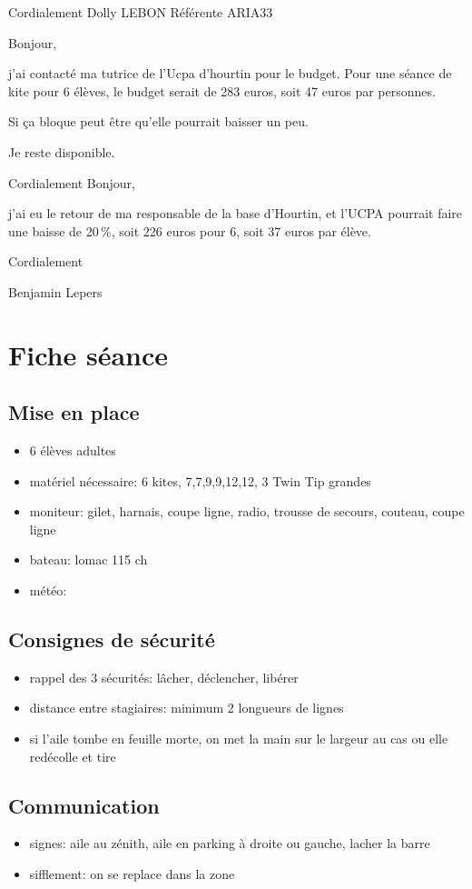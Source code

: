 \documentclass[11pt,a4paper]{report}
\begin{document}
Cordialement
Dolly LEBON
Référente ARIA33

\bigskip
Bonjour,

j'ai contacté ma tutrice de l'Ucpa d'hourtin pour le budget.
Pour une séance de kite  pour 6 élèves, le budget serait de 283 euros,
soit 47 euros par personnes.

Si ça bloque peut être qu'elle pourrait baisser un peu.


Je reste disponible.

Cordialement
\bigskip
Bonjour,

j'ai eu le retour de ma responsable de la base d'Hourtin, et l'UCPA
pourrait faire une baisse de 20\,\%, soit 226 euros pour 6, soit 37 euros
par élève.

Cordialement

Benjamin Lepers
\chapter{Fiche séance\label{fiche_seance}}
\section{Mise en place}
\begin{itemize}
\item 6 élèves adultes
\item matériel nécessaire: 6 kites, 7,7,9,9,12,12, 3 Twin Tip grandes
\item moniteur: gilet, harnais, coupe ligne, radio, trousse de secours, couteau, coupe ligne
\item bateau: lomac 115 ch
\item météo: 
\end{itemize}
\section{Consignes de sécurité}
\begin{itemize}
\item rappel des 3 sécurités: lâcher, déclencher, libérer
\item distance entre stagiaires: minimum 2 longueurs de lignes
\item si l'aile tombe en feuille morte, on met la main sur le largeur au cas ou elle redécolle et tire
\end{itemize}
\section{Communication}
\begin{itemize}
\item signes: aile au zénith, aile en parking à droite ou gauche, lacher la barre
\item sifflement: on se replace dans la zone
\end{itemize}
\end{document}
